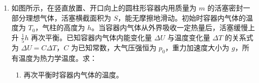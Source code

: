 \documentclass[\gkver]{gaokaozhenti}
\begin{document}
\begin{enumerate}
{则 $l$ 与 $g$、$l_{0}$、$T$ 的关系式为 $l = l_{0} + \Delta l = l_{0} + \frac{gT^{2}}{4\pi^{2}}$

（3）根据 $l = l_{0} + \frac{gT^{2}}{4\pi^{2}}$ 整理可得 $l = l_{0} + \frac{g}{4\pi^{2}}T^{2}$

则 $l - T^{2}$ 图像斜率

$k = \frac{g}{4\pi^{2}} = \frac{0.542 - 0.474}{0.58 - 0.3}$

解得 $g \approx 9.59 \Umsq$

（4）A．空气阻力的存在会影响弹簧振子的振动周期，是实验的误差来源之一，故 A 正确；B．弹簧质量不为零导致振子在平衡位置时弹簧的长度变化，不影响其他操作，根据（3）中处理方法可知对实验结果没有影响，故 B 错误；C．根据实验步骤可知光电门的位置稍微偏离托盘的平衡位置会影响振子周期的测量，是实验的误差来源之一，故 C 正确。

故选 AC。
}

\item
如图所示，在竖直放置、开口向上的圆柱形容器内用质量为 $ m $ 的活塞密封一部分理想气体，活塞横截面积为 $ S $，能无摩擦地滑动。初始时容器内气体的温度为 $ T_{0} $，气柱的高度为 $ h $。当容器内气体从外界吸收一定热量后，活塞缓慢上升 $ \frac{1}{5}h $ 再次平衡。已知容器内气体内能变化量 $ \Delta U $ 与温度变化量 $ \Delta T $ 的关系式为 $ \Delta U = C\Delta T $，$ C $ 为已知常数，大气压强恒为 $ p_{0} $，重力加速度大小为 $ g $，所有温度为热力学温度。求：
\begin{enumerate}
	\item 
	再次平衡时容器内气体的温度。
	

\end{enumerate}
\end{enumerate}
\end{document}
